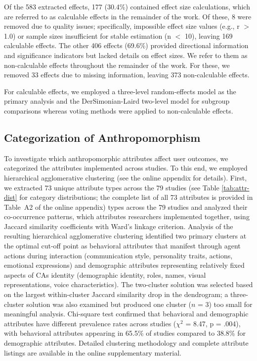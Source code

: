\documentclass[lettersize,journal]{IEEEtran}
\begin{document}
Of the 583 extracted effects, 177 (30.4\%) contained effect size calculations, which are referred to as calculable effects in the remainder of the work. Of these, 8 were removed due to quality issues; specifically, impossible effect size values (e.g., r $>$ 1.0) or sample sizes insufficient for stable estimation (n $<$ 10), leaving 169 calculable effects. The other 406 effects (69.6\%) provided directional information and significance indicators but lacked details on effect sizes. We refer to them as non-calculable effects throughout the remainder of the work. For these, we removed 33 effects due to missing information, leaving 373 non-calculable effects. 

For calculable effects, we employed a three-level random-effects model as the primary analysis and the DerSimonian-Laird two-level model for subgroup comparisons whereas voting methods were applied to non-calculable effects.

\subsection{Categorization of Anthropomorphism}

To investigate which anthropomorphic attributes affect user outcomes, we categorized the attributes implemented across studies. To this end, we employed hierarchical agglomerative clustering (see the online appendix for details). First, we extracted 73 unique attribute types across the 79 studies (see Table \ref{tab:attr-dist} for category distributions; the complete list of all 73 attributes is provided in Table~A2 of the online appendix)
types across the 79 studies and analyzed their co-occurrence patterns, which attributes researchers implemented together, using Jaccard similarity coefficients with Ward's linkage criterion. %
Analysis of the resulting hierarchical agglomerative clustering identified two primary clusters at the optimal cut-off point as behavioral attributes that manifest through agent actions during interaction (communication style, personality traits, actions, emotional expressions) and demographic attributes representing relatively fixed aspects of CAs identity (demographic identity, roles, names, visual representations, voice characteristics). The two-cluster solution was selected based on the largest within-cluster Jaccard similarity drop in the dendrogram; a three-cluster solution was also examined but produced one cluster ($n$ = 3) too small for meaningful analysis. Chi-square test confirmed that behavioral and demographic attributes have different prevalence rates across studies ($\chi^2$ = 8.47, p = .004), with behavioral attributes appearing in 65.5\% of studies compared to 38.8\% for demographic attributes. Detailed clustering methodology and complete attribute listings are available in the online supplementary material.
\end{document}
